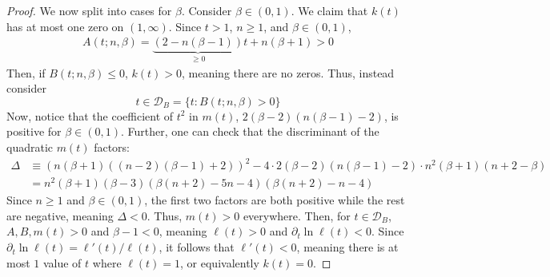 \documentclass[10pt,a4paper]{amsart}
\newcommand{\p}{\partial}
\begin{document}
\begin{proof}

We now split into cases for $\beta$. Consider $\beta\in (0,1)$. We claim that $k(t)$ has at most one zero on $(1,\infty)$. Since $t>1$, $n\geq 1$, and $\beta \in (0,1)$, 
\begin{align*}
   A(t;n,\beta)=\underbrace{(2-n(\beta-1))}_{\geq 0}t+n(\beta+1)>0 
\end{align*}
Then, if $B(t;n,\beta)\leq 0$, $k(t)>0$, meaning there are no zeros. Thus, instead consider 
$$t\in \mathcal{D}_B=\{t:B(t;n,\beta)>0\}$$
Now, notice that the coefficient of $t^2$ in $m(t)$, $2(\beta-2)(n(\beta-1)-2)$, is positive for $\beta\in (0,1)$. Further, one can check that the discriminant of the quadratic $m(t)$ factors:
\begin{align*}
    \Delta&\equiv (n(\beta+1)((n-2)(\beta-1)+2))^2-4\cdot 2(\beta-2)(n(\beta-1)-2)\cdot n^2(\beta+1)(n+2-\beta)\\
    &=n^2(\beta+1)(\beta-3)(\beta(n+2)-5n-4)(\beta(n+2)-n-4)
\end{align*}
Since $n\geq 1$ and $\beta \in (0,1)$, the first two factors are both positive while the rest are negative, meaning $\Delta < 0$. Thus, $m(t)>0$ everywhere. Then, for $t\in \mathcal{D}_B$, $A,B,m(t)>0$ and $\beta-1<0$, meaning $\ell(t)>0$ and $\p_t\ln \ell(t)<0$. Since $\p_t \ln \ell(t)=\ell'(t)/\ell(t)$, it follows that $\ell'(t)<0$, meaning there is at most $1$ value of $t$ where $\ell(t)=1$, or equivalently $k(t)=0$. 


\end{proof}
\end{document}
